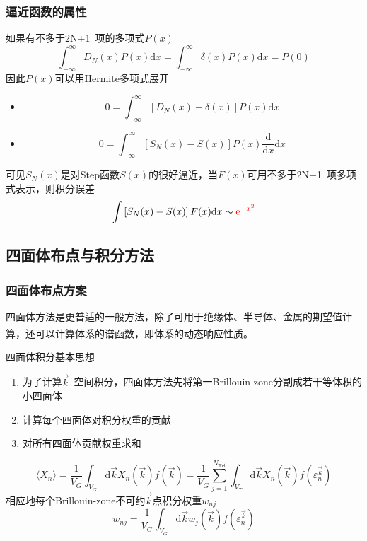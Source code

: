 \documentclass[cjk,slidestop,compress,mathserif,blue]{beamer}
\newcommand{\upcite}[1]{\hspace{0ex}\textsuperscript{\cite{#1}}} %
\begin{document}
\frame
{
	\frametitle{逼近函数的属性}
	如果有不多于\textrm{2N+1~}项的多项式$P(x)$
	\begin{displaymath}
		\int_{-\infty}^{\infty}D_N(x)P(x)\mathrm{d}x=\int_{-\infty}^{\infty}\delta(x)P(x)\mathrm{d}x=P(0)
	\end{displaymath}
	因此$P(x)$可以用\textrm{Hermite}多项式展开
\begin{itemize}
	\item \begin{displaymath}
			0=\int_{-\infty}^{\infty}\left[D_N(x)-\delta(x)\right]P(x)\mathrm{d}x
	\end{displaymath}
	\item \begin{displaymath}
			0=\int_{-\infty}^{\infty}\left[S_N(x)-S(x)\right]P(x)\frac{{\mathrm d}}{\mathrm dx}\mathrm{d}x
	\end{displaymath}
\end{itemize}
可见$S_N(x)$是对\textrm{Step}函数$S(x)$的很好逼近，当$F(x)$可用不多于\textrm{2N+1~}项多项式表示，则积分误差
$$\int\left[S_N(x)-S(x)\right]F(x)\mathrm{d}x\sim\textcolor{red}{\mathrm{e}^{-x^2}}$$
}

\subsection{四面体布点与积分方法}
\frame
{
	\frametitle{四面体布点方案}
	四面体方法是更普适的一般方法，除了可用于绝缘体、半导体、金属的期望值计算，还可以计算体系的谱函数，即体系的动态响应性质。\upcite{PRB49-16233_1994}

	四面体积分基本思想
	\begin{enumerate}
		\item 为了计算$\vec k$~空间积分，四面体方法先将第一\textrm{Brillouin-zone}分割成若干等体积的小四面体
		\item 计算每个四面体对积分权重的贡献
		\item 对所有四面体贡献权重求和
	\end{enumerate}
	\begin{displaymath}
		\langle X_n\rangle=\dfrac1{V_G}\int_{V_G}\mathrm{d}\vec kX_n(\vec k)f(\vec k)=\dfrac1{V_G}\sum_{j=1}^{N_{\mathrm{Tet}}}\int_{V_T}\mathrm{d}\vec kX_n(\vec k)f(\varepsilon_n^{\vec k})
	\end{displaymath}
	相应地每个\textrm{Brillouin-zone}不可约$\vec k$点积分权重$w_{nj}$
	\begin{displaymath}
		w_{nj}=\dfrac1{V_G}\int_{V_G}\mathrm{d}\vec kw_j(\vec k)f(\varepsilon_n^{\vec k})
	\end{displaymath}
}
\end{document}
